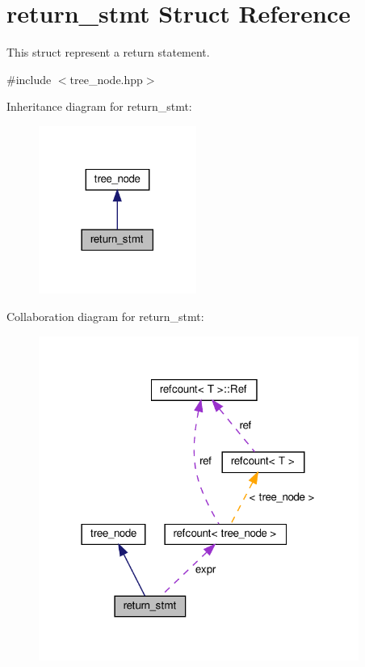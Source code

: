 \hypertarget{structreturn__stmt}{}\section{return\+\_\+stmt Struct Reference}
\label{structreturn__stmt}


This struct represent a \textquotesingle{}return\textquotesingle{} statement.  




{\ttfamily \#include $<$tree\+\_\+node.\+hpp$>$}



Inheritance diagram for return\+\_\+stmt\+:
\nopagebreak
\begin{figure}[H]
\begin{center}
\leavevmode
\includegraphics[width=146pt]{d5/dae/structreturn__stmt__inherit__graph}
\end{center}
\end{figure}


Collaboration diagram for return\+\_\+stmt\+:
\nopagebreak
\begin{figure}[H]
\begin{center}
\leavevmode
\includegraphics[width=297pt]{dd/d17/structreturn__stmt__coll__graph}
\end{center}
\end{figure}
